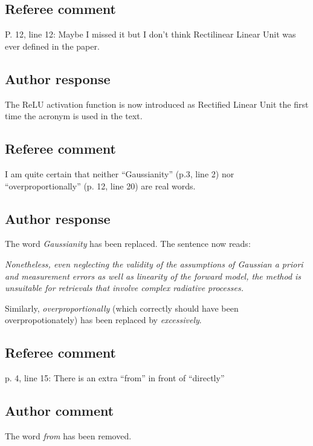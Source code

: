 \documentclass[journal abbreviation, manuscript]{copernicus}
\begin{document}
\subsection*{Referee comment}

P. 12, line 12:  Maybe I missed it but I don’t think Rectilinear Linear Unit was ever
defined in the paper.

\subsection*{Author response}

The ReLU activation function is now introduced as Rectified Linear Unit the
first time the acronym is used in the text.

\subsection*{Referee comment}
I am quite certain that neither “Gaussianity” (p.3, line 2) nor “overproportionally” (p. 12,
line 20) are real words.

\subsection*{Author response}

The word \emph{Gaussianity} has been replaced. The sentence now reads:

\vspace{1em}
\textit{
Nonetheless, even neglecting the validity of the assumptions of Gaussian
a priori and measurement errors as well as linearity of the forward
model, the method is unsuitable for retrievals that involve complex
radiative processes.
}
\vspace{1em}

Similarly, \emph{overproportionally} (which correctly should have been
overpropotionately) has been replaced by \emph{excessively}.

\subsection*{Referee comment}

p. 4, line 15: There is an extra “from” in front of “directly”

\subsection*{Author comment}

The word \emph{from} has been removed.
\end{document}
